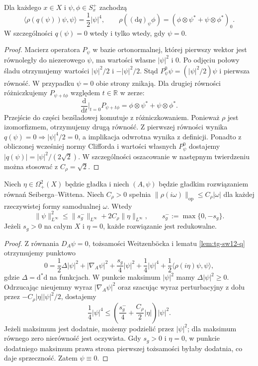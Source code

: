 \begin{lemat}
\label{lem:tg-sw12-q}
Dla każdego $x\in X$ i $\psi,\phi\in S_x^+$ zachodzą
\[
\langle\rho(q(\psi))\psi,\psi\rangle=\frac12|\psi|^4,
\qquad
\rho((\mathrm dq)_\psi\phi)
=(\phi\otimes\psi^*+\psi\otimes\phi^*)_0.
\]
W szczególności $q(\psi)=0$ wtedy i tylko wtedy, gdy $\psi=0$.
\end{lemat}

\begin{proof}
Macierz operatora $P_\psi$ w bazie ortonormalnej, której
pierwszy wektor jest równoległy do niezerowego $\psi$,
ma wartości własne $|\psi|^2$ i $0$. Po odjęciu połowy
śladu otrzymujemy wartości $|\psi|^2/2$ i $-|\psi|^2/2$.
Stąd $P_\psi^0\psi=(|\psi|^2/2)\psi$ i pierwsza
równość. W przypadku $\psi=0$ obie strony znikają.
Dla drugiej równości różniczkujemy
$P_{\psi+t\phi}$ względem $t\in\mathbb R$ w zerze:
\[
\frac{\mathrm d}{\mathrm dt}\bigg|_{t=0}P_{\psi+t\phi}
=\phi\otimes\psi^*+\psi\otimes\phi^*.
\]
Przejście do części bezśladowej komutuje z różniczkowaniem.
Ponieważ $\rho$ jest izomorfizmem, otrzymujemy
drugą równość. Z pierwszej równości wynika
$q(\psi)=0\Rightarrow|\psi|^4/2=0$,
a implikacja odwrotna wynika z definicji.
Ponadto z obliczonej wcześniej normy Clifforda
i wartości własnych $P_\psi^0$ dostajemy
$|q(\psi)|=|\psi|^2/(2\sqrt2)$.
W szczególności oszacowanie w następnym
twierdzeniu można stosować z $C_\rho=\sqrt2$.
\end{proof}

\begin{twierdzenie}
\label{thm:tg-sw12-spinor-bound}
Niech $\eta\in\Omega^2_+(X)$ będzie gładka i niech $(A,\psi)$
będzie gładkim rozwiązaniem równań Seiberga--Wittena.
Niech $C_\rho>0$ spełnia
$\|\rho(i\omega)\|_{\mathrm{op}}\le C_\rho|\omega|$
dla każdej rzeczywistej formy samodualnej $\omega$.
Wtedy
\[
\|\psi\|_{L^\infty}^2\le
\|s_g^-\|_{L^\infty}+2C_\rho\|\eta\|_{L^\infty},
\qquad s_g^-:=\max\{0,-s_g\}.
\]
Jeżeli $s_g>0$ na całym $X$ i $\eta=0$, każde rozwiązanie
jest redukowalne.
\end{twierdzenie}

\begin{proof}
Z równania $D_A\psi=0$, tożsamości Weitzenböcka i
lematu \ref{lem:tg-sw12-q} otrzymujemy punktowo
\[
0=\frac12\Delta|\psi|^2+|\nabla_A\psi|^2
 +\frac{s_g}{4}|\psi|^2+\frac14|\psi|^4
 +\frac12\langle\rho(i\eta)\psi,\psi\rangle,
\]
gdzie $\Delta=\mathrm d^*\mathrm d$ na funkcjach.
W punkcie maksimum $|\psi|^2$ mamy $\Delta|\psi|^2\ge0$.
Odrzucając nieujemny wyraz $|\nabla_A\psi|^2$ oraz
szacując wyraz perturbacyjny z dołu przez
$-C_\rho|\eta||\psi|^2/2$, dostajemy
\[
\frac14|\psi|^4\le
\left(\frac{s_g^-}{4}+\frac{C_\rho}{2}|\eta|\right)
|\psi|^2.
\]
Jeżeli maksimum jest dodatnie, możemy podzielić przez
$|\psi|^2$; dla maksimum równego zero nierówność jest
oczywista. Gdy $s_g>0$ i $\eta=0$, w punkcie dodatniego
maksimum prawa strona pierwszej tożsamości byłaby dodatnia,
co daje sprzeczność. Zatem $\psi\equiv0$.
\end{proof}

